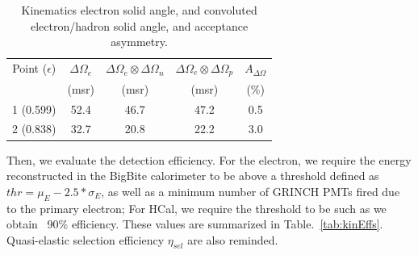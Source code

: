 \begin{table}[h]
\centering
\begin{tabular}{|c|c|c|c|c|}
\hline
Point ($\epsilon$) & $\Delta\Omega_e$ & $\Delta\Omega_e \otimes \Delta\Omega_n$ & $\Delta\Omega_e \otimes \Delta\Omega_p$ & $A_{\Delta\Omega}$ \\
 & (msr) & (msr) & (msr) & (\%) \\
\hline
1 (0.599) & 52.4 & 46.7 & 47.2 & 0.5 \\
\hline
2 (0.838) & 32.7 & 20.8 & 22.2 & 3.0 \\
\hline
\end{tabular} 
\caption{Kinematics electron solid angle, and convoluted electron/hadron solid angle, and acceptance asymmetry.}
\label{tab:kinExpParams}
\end{table}

Then, we evaluate the detection efficiency. For the electron, we require the energy reconstructed in the BigBite calorimeter to be above a threshold defined as $thr = \mu_E- 2.5* \sigma_E$, as well as a minimum number of GRINCH PMTs fired due to the primary electron; For HCal, we require the threshold to be such as we obtain ~90\% efficiency. These values are summarized in Table.~\ref{tab:kinEffs}.
Quasi-elastic selection efficiency $\eta_{sel}$ are also reminded.

